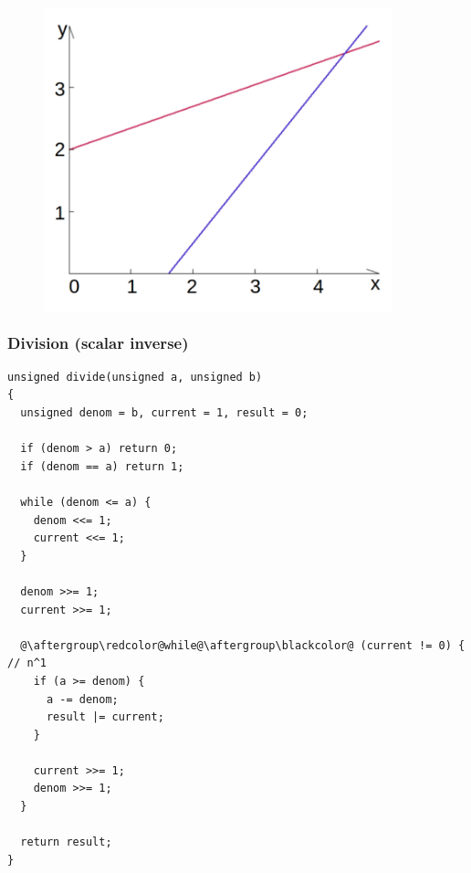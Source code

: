 \documentclass[xcolor=dvipsnames]{beamer}
\begin{document}
\begin{frame}[fragile]
\begin{figure}
\begin{columns}
    \includegraphics[width=0.9\textwidth]{intersecting_lines}
  \end{columns}
\end{figure}
\end{frame}


\begin{frame}[fragile]
  \frametitle{Division (scalar inverse)}
  \begin{lstlisting}[basicstyle=\tiny\ttfamily]
unsigned divide(unsigned a, unsigned b)
{
  unsigned denom = b, current = 1, result = 0;

  if (denom > a) return 0;
  if (denom == a) return 1;

  while (denom <= a) {
    denom <<= 1;
    current <<= 1;
  }

  denom >>= 1;
  current >>= 1;

  @\aftergroup\redcolor@while@\aftergroup\blackcolor@ (current != 0) {  // n^1
    if (a >= denom) {
      a -= denom;
      result |= current;
    }

    current >>= 1;
    denom >>= 1;
  }

  return result;
}
\end{lstlisting}
\end{frame}
\end{document}
